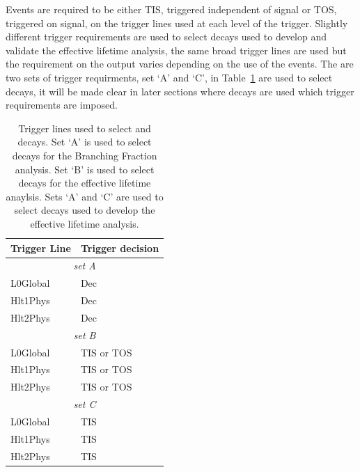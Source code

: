 Events are required to be either TIS, triggered independent of signal or TOS, triggered on signal, on the trigger lines used at each level of the trigger.
Slightly different trigger requirements are used to select \bhh decays used to develop and validate the effective lifetime analysis, the same broad trigger lines are used but the requirement on the output varies depending on the use of the \bhh events. The are two sets of trigger requirments, set `A' and `C', in Table~\ref{tab:triggers} are used to select \bhh decays, it will be made clear in later sections where \bhh decays are used which trigger requirements are imposed. 

\begin{table}[ht]
\begin{center}
\begin{tabular}{ll}
\hline
Trigger Line	& Trigger decision \\ \hline
\multicolumn{2}{c}{{\it set A}} \\ \hline
L0Global	& Dec\\
Hlt1Phys	& Dec \\
Hlt2Phys	& Dec \\ \hline
\multicolumn{2}{c}{{\it set B}} \\ \hline
L0Global	& TIS or TOS \\
Hlt1Phys	& TIS or TOS \\
Hlt2Phys	& TIS or TOS \\ \hline
\multicolumn{2}{c}{{\it set C}} \\ \hline
L0Global	& TIS\\
Hlt1Phys	& TIS \\
Hlt2Phys	& TIS \\ \hline
\end{tabular}
\caption{Trigger lines used to select \bsmumu and \bhh decays. Set `A' is used to select decays for the Branching Fraction analysis. Set `B' is used to select \bsmumu decays for the effective lifetime anaylsis. Sets `A' and `C' are used to select \bhh decays used to develop the \bsmumu effective lifetime analysis.}
\label{tab:triggers}
\end{center}
\end{table}


